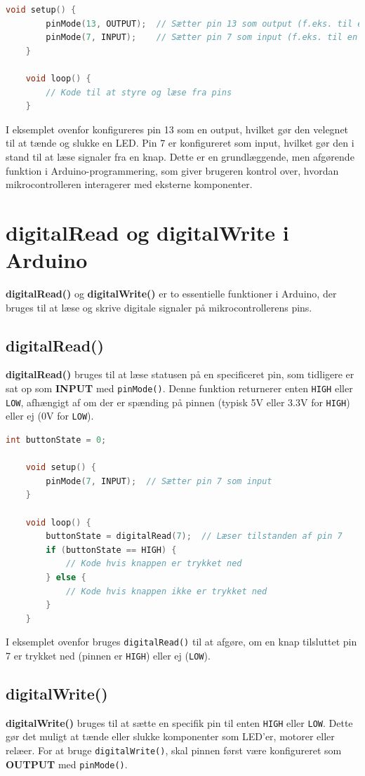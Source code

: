 \begin{lstlisting}[language=C++, caption=Eksempel på brug af pinMode]
	void setup() {
		pinMode(13, OUTPUT);  // Sætter pin 13 som output (f.eks. til en LED)
		pinMode(7, INPUT);    // Sætter pin 7 som input (f.eks. til en knap)
	}
	
	void loop() {
		// Kode til at styre og læse fra pins
	}
\end{lstlisting}
I eksemplet ovenfor konfigureres pin 13 som en output, hvilket gør den velegnet til at tænde og slukke en LED. Pin 7 er konfigureret som input, hvilket gør den i stand til at læse signaler fra en knap. Dette er en grundlæggende, men afgørende funktion i Arduino-programmering, som giver brugeren kontrol over, hvordan mikrocontrolleren interagerer med eksterne komponenter.

\section{digitalRead og digitalWrite i Arduino}
\textbf{digitalRead()} og \textbf{digitalWrite()} er to essentielle funktioner i Arduino, der bruges til at læse og skrive digitale signaler på mikrocontrollerens pins.

\subsection{digitalRead()}
\textbf{digitalRead()} bruges til at læse statusen på en specificeret pin, som tidligere er sat op som \textbf{INPUT} med \texttt{pinMode()}. Denne funktion returnerer enten \texttt{HIGH} eller \texttt{LOW}, afhængigt af om der er spænding på pinnen (typisk 5V eller 3.3V for \texttt{HIGH}) eller ej (0V for \texttt{LOW}).
\begin{lstlisting}[language=C++, caption=Eksempel på brug af digitalRead]
	int buttonState = 0;
	
	void setup() {
		pinMode(7, INPUT);  // Sætter pin 7 som input
	}
	
	void loop() {
		buttonState = digitalRead(7);  // Læser tilstanden af pin 7
		if (buttonState == HIGH) {
			// Kode hvis knappen er trykket ned
		} else {
			// Kode hvis knappen ikke er trykket ned
		}
	}
\end{lstlisting}
I eksemplet ovenfor bruges \texttt{digitalRead()} til at afgøre, om en knap tilsluttet pin 7 er trykket ned (pinnen er \texttt{HIGH}) eller ej (\texttt{LOW}).

\subsection{digitalWrite()}
\textbf{digitalWrite()} bruges til at sætte en specifik pin til enten \texttt{HIGH} eller \texttt{LOW}. Dette gør det muligt at tænde eller slukke komponenter som LED'er, motorer eller relæer. For at bruge \texttt{digitalWrite()}, skal pinnen først være konfigureret som \textbf{OUTPUT} med \texttt{pinMode()}.

